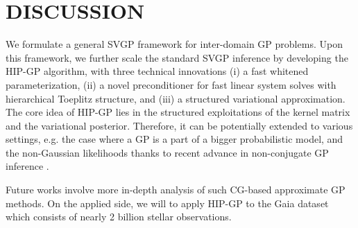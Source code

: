 \section{DISCUSSION}
We formulate a general SVGP framework for inter-domain GP problems.
Upon this framework, we further scale the standard SVGP inference
by developing the HIP-GP algorithm,
with three technical innovations (i) a fast whitened parameterization,
(ii) a novel preconditioner for fast linear system solves with
hierarchical Toeplitz structure, and (iii)
a structured variational approximation.
The core idea of HIP-GP lies in the structured exploitations of the kernel matrix and the variational posterior.
Therefore, it can be potentially extended to various settings, e.g.
the case where a GP is a part
of a bigger probabilistic model,
and the non-Gaussian likelihoods thanks to recent advance
in non-conjugate GP inference \citep{salimbeni2018natural}.

Future works involve more in-depth analysis of
such CG-based approximate GP methods.
On the applied side, we will to apply HIP-GP to
the Gaia dataset \citep{gaia2018gaia}
which consists of nearly 2 billion stellar observations. 
